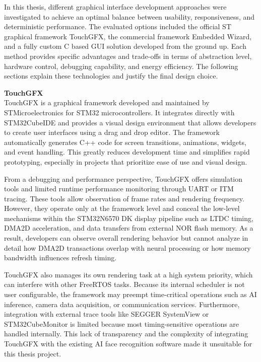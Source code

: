 \vspace{1em}
In this thesis, different graphical interface development approaches were investigated to achieve an optimal balance between usability, responsiveness, and deterministic performance. The evaluated options included the official ST graphical framework TouchGFX, the commercial framework Embedded Wizard, and a fully custom C based GUI solution developed from the ground up. Each method provides specific advantages and trade-offs in terms of abstraction level, hardware control, debugging capability, and energy efficiency. The following sections explain these technologies and justify the final design choice.

\vspace{0.8em}
\textbf{TouchGFX}\\
TouchGFX is a graphical framework developed and maintained by STMicroelectronics for STM32 microcontrollers. It integrates directly with STM32CubeIDE and provides a visual design environment that allows developers to create user interfaces using a drag and drop editor. The framework automatically generates C++ code for screen transitions, animations, widgets, and event handling. This greatly reduces development time and simplifies rapid prototyping, especially in projects that prioritize ease of use and visual design.

\vspace{1em}
From a debugging and performance perspective, TouchGFX offers simulation tools and limited runtime performance monitoring through UART or ITM tracing. These tools allow observation of frame rates and rendering frequency. However, they operate only at the framework level and conceal the low-level mechanisms within the STM32N6570 DK display pipeline such as LTDC timing, DMA2D acceleration, and data transfers from external NOR flash memory. As a result, developers can observe overall rendering behavior but cannot analyze in detail how DMA2D transactions overlap with neural processing or how memory bandwidth influences refresh timing.

\vspace{1em}
TouchGFX also manages its own rendering task at a high system priority, which can interfere with other FreeRTOS tasks. Because its internal scheduler is not user configurable, the framework may preempt time-critical operations such as AI inference, camera data acquisition, or communication services. Furthermore, integration with external trace tools like SEGGER SystemView or STM32CubeMonitor is limited because most timing-sensitive operations are handled internally. This lack of transparency and the complexity of integrating TouchGFX with the existing AI face recognition software made it unsuitable for this thesis project.

